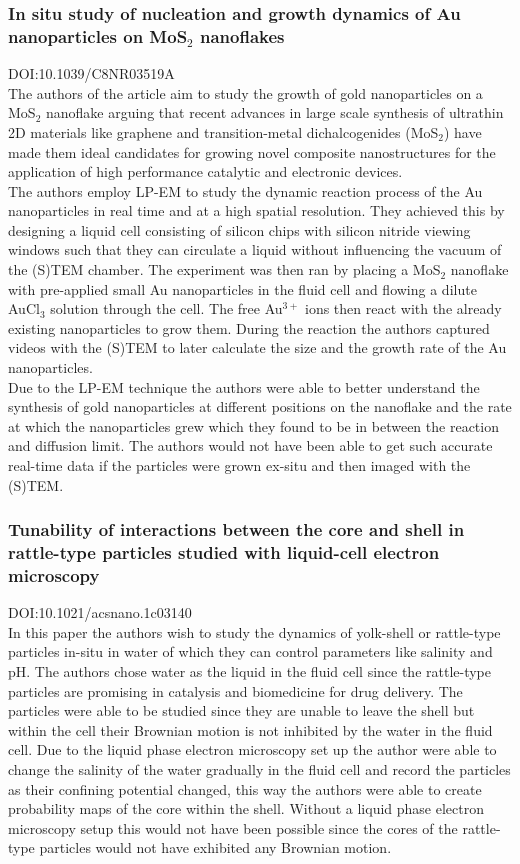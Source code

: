 \documentclass[a4paper]{scrartcl}
\begin{document}
\subsubsection*{In situ study of nucleation and growth dynamics of Au nanoparticles on MoS$_2$ nanoflakes}
{\color{gray}\footnotesize DOI:10.1039/C8NR03519A}\\
The authors of the article aim to study the growth of gold nanoparticles on a MoS$_2$ nanoflake arguing that recent advances in large scale synthesis of ultrathin 2D materials like graphene and transition-metal dichalcogenides (MoS$_2$) have made them ideal candidates for growing novel composite nanostructures for the application of high performance catalytic and electronic devices.\\
The authors employ LP-EM to study the dynamic reaction process of the Au nanoparticles in real time and at a high spatial resolution. They achieved this by designing a liquid cell consisting of silicon chips with silicon nitride viewing windows such that they can circulate a liquid without influencing the vacuum of the (S)TEM chamber. The experiment was then ran by placing a MoS$_2$ nanoflake with pre-applied small Au nanoparticles in the fluid cell and flowing a dilute AuCl$_3$ solution through the cell. The free Au$^{3+}$ ions then react with the already existing nanoparticles to grow them. During the reaction the authors captured videos with the (S)TEM to later calculate the size and the growth rate of the Au nanoparticles.\\
Due to the LP-EM technique the authors were able to better understand the synthesis of gold nanoparticles at different positions on the nanoflake and the rate at which the nanoparticles grew which they found to be in between the reaction and diffusion limit. The authors would not have been able to get such accurate real-time data if the particles were grown ex-situ and then imaged with the (S)TEM.

\subsubsection*{Tunability of interactions between the core and shell in rattle-type particles studied with liquid-cell electron microscopy}
{\color{gray}\footnotesize DOI:10.1021/acsnano.1c03140}\\
In this paper the authors wish to study the dynamics of yolk-shell or rattle-type particles in-situ in water of which they can control parameters like salinity and pH. The authors chose water as the liquid in the fluid cell since the rattle-type particles are promising in catalysis and biomedicine for drug delivery. The particles were able to be studied since they are unable to leave the shell but within the cell their Brownian motion is not inhibited by the water in the fluid cell. Due to the liquid phase electron microscopy set up the author were able to change the salinity of the water gradually in the fluid cell and record the particles as their confining potential changed, this way the authors were able to create probability maps of the core within the shell. Without a liquid phase electron microscopy setup this would not have been possible since the cores of the rattle-type particles would not have exhibited any Brownian motion.
\end{document}
